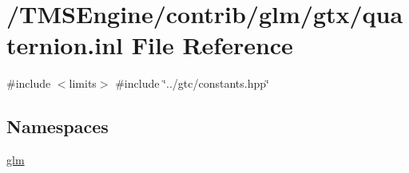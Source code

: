 \hypertarget{gtx_2quaternion_8inl}{}\section{/\+T\+M\+S\+Engine/contrib/glm/gtx/quaternion.inl File Reference}
\label{gtx_2quaternion_8inl}
{\ttfamily \#include $<$limits$>$}\newline
{\ttfamily \#include \char`\"{}../gtc/constants.\+hpp\char`\"{}}\newline
\subsection*{Namespaces}
\begin{DoxyCompactItemize}
\item 
 \hyperlink{namespaceglm}{glm}
\end{DoxyCompactItemize}
